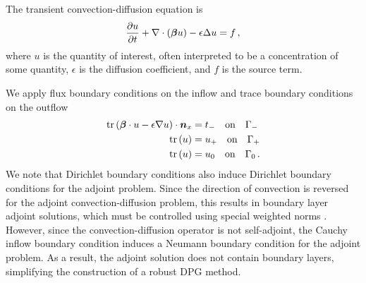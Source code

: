 \documentclass[Dissertation.tex]{subfiles}
\begin{document}
The transient convection-diffusion equation is
\begin{equation*}
\frac{\partial u}{\partial t}+\nabla\cdot(\boldsymbol\beta u)-\epsilon\Delta u=f\,,
\end{equation*}
where $u$ is the quantity of interest, often interpreted to be a concentration of some quantity,
$\epsilon$ is the  diffusion coefficient, and $f$ is the source term.

We apply flux boundary conditions on the inflow and trace boundary conditions on the outflow
\begin{align*}
\operatorname*{tr}\left( \boldsymbol\beta\cdot u-\epsilon\nabla u \right)\cdot\boldsymbol n_x&=t_-\quad\text{on}\quad\Gamma_-\\
\operatorname*{tr}\left( u \right)&=u_+\quad\text{on}\quad\Gamma_+\\
\operatorname*{tr}\left( u \right)&=u_0\quad\text{on}\quad\Gamma_0\,.
\end{align*}
We note that Dirichlet boundary conditions also induce Dirichlet boundary conditions for the adjoint problem.  
Since the direction of convection is reversed for the adjoint convection-diffusion problem, 
this results in boundary layer adjoint solutions, which must be controlled using special weighted norms \cite{RoosStynesTobiska08,DemkowiczHeuer}.
However, since the convection-diffusion operator is not self-adjoint, the Cauchy inflow boundary condition induces a Neumann boundary condition for the adjoint problem.  As a result, the adjoint solution does not contain boundary layers, simplifying the construction of a robust DPG method.
\end{document}

